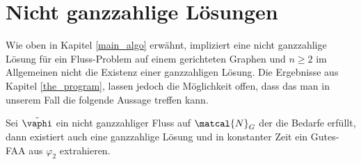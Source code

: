 \chapter{Nicht ganzzahlige Lösungen}

Wie oben in Kapitel \ref{main_algo} erwähnt, impliziert eine nicht ganzzahlige Lösung für ein Fluss-Problem auf einem gerichteten Graphen und $n\geq 2$ im Allgemeinen nicht die Existenz einer ganzzahligen Lösung. Die Ergebnisse aus Kapitel \ref{the_program}, lassen jedoch die Möglichkeit offen, dass das man in unserem Fall die folgende Aussage treffen kann.

\begin{conjecture}
Sei $\tilde{\vaphi}$ ein nicht ganzzahliger Fluss auf $\matcal{N}_G$ der die Bedarfe erfüllt, dann existiert auch eine ganzzahlige Lösung und in konstanter Zeit ein Gutes-FAA aus $\varphi_2$ extrahieren.
\end{conjecture}